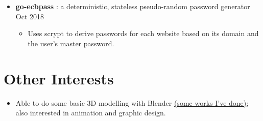 \documentclass[a4paper]{article}
\begin{document}
\begin{itemize}
    \item \textbf{go-ecbpass} : a deterministic, stateless pseudo-random password generator \dashdiv{} Oct 2018

    \begin{itemize}
      \item Uses scrypt to derive passwords for each website based on its domain and the user's master password.
    \end{itemize}

  \end{itemize}

  \section{Other Interests}

  \begin{itemize}[itemsep=0.1\parskip]
    \item Able to do some basic 3D modelling with Blender \href{https://maowtm.org/Artworks/}{\color{link}(some works I've done)}; also interested in animation and graphic design.
  \end{itemize}
\end{document}
